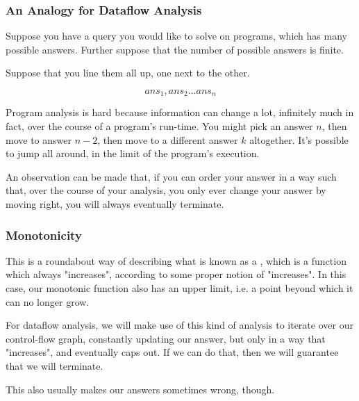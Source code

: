\documentclass[aspectratio=169, handout]{beamer}
\begin{document}
\begin{frame}[fragile]
  \frametitle{An Analogy for Dataflow Analysis}

  Suppose you have a query you would like to solve on programs, which has many
  possible answers. Further suppose that the number of possible answers is finite.

  \pause
  \vspace{\fill}

  Suppose that you line them all up, one next to the other.

  \pause
  \vspace{\fill}

  $$ans_1, ans_2 ... ans_n$$

  \pause
  \vspace{\fill}

  Program analysis is hard because information can change a lot, infinitely much
  in fact, over the course of a program's run-time. You might pick an answer $n$,
  then move to answer $n - 2$, then move to a different answer $k$ altogether. It's
  possible to jump all around, in the limit of the program's execution.

  \pause
  \vspace{\fill}

  An observation can be made that, if you can order your answer in a way such that,
  over the course of your analysis, you only ever change your answer by moving
  right, you will always eventually terminate.
\end{frame}

\begin{frame}[fragile]
  \frametitle{Monotonicity}

  This is a roundabout way of describing what is known as a ,
  which is a function which always "increases", according to some proper notion of
  "increases". In this case, our monotonic function also has an upper limit, i.e.
  a point beyond which it can no longer grow.

  \pause
  \vspace{\fill}

  For dataflow analysis, we will make use of this kind of analysis to iterate over
  our control-flow graph, constantly updating our answer, but only in a way that
  "increases", and eventually caps out. If we can do that, then we will
  guarantee that we will terminate.

  \pause
  \vspace{\fill}

  This also usually makes our answers sometimes wrong, though.
\end{frame}
\end{document}
